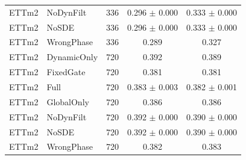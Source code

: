 \begin{tabular}{llrcc}
ETTm2 & NoDynFilt & 336 & 0.296 $\pm$ 0.000 & 0.333 $\pm$ 0.000 \\
ETTm2 & NoSDE & 336 & 0.296 $\pm$ 0.000 & 0.333 $\pm$ 0.000 \\
ETTm2 & WrongPhase & 336 & 0.289 & 0.327 \\
ETTm2 & DynamicOnly & 720 & 0.392 & 0.389 \\
ETTm2 & FixedGate & 720 & 0.381 & 0.381 \\
ETTm2 & Full & 720 & 0.383 $\pm$ 0.003 & 0.382 $\pm$ 0.001 \\
ETTm2 & GlobalOnly & 720 & 0.386 & 0.386 \\
ETTm2 & NoDynFilt & 720 & 0.392 $\pm$ 0.000 & 0.390 $\pm$ 0.000 \\
ETTm2 & NoSDE & 720 & 0.392 $\pm$ 0.000 & 0.390 $\pm$ 0.000 \\
ETTm2 & WrongPhase & 720 & 0.382 & 0.383 \\
\bottomrule
\end{tabular}
